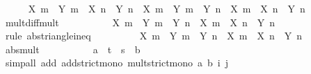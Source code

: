 \begin{isabellebody}
\ \ \ \ \isamarkupfalse%
\ {\isachardoublequoteopen}{\isasymbar}X\ m\ {\isacharasterisk}{\kern0pt}\ Y\ m\ {\isacharminus}{\kern0pt}\ X\ n\ {\isacharasterisk}{\kern0pt}\ Y\ n{\isasymbar}\ {\isacharequal}{\kern0pt}\ {\isasymbar}X\ m\ {\isacharasterisk}{\kern0pt}\ {\isacharparenleft}{\kern0pt}Y\ m\ {\isacharminus}{\kern0pt}\ Y\ n{\isacharparenright}{\kern0pt}\ {\isacharplus}{\kern0pt}\ {\isacharparenleft}{\kern0pt}X\ m\ {\isacharminus}{\kern0pt}\ X\ n{\isacharparenright}{\kern0pt}\ {\isacharasterisk}{\kern0pt}\ Y\ n{\isasymbar}{\isachardoublequoteclose}\isanewline
\ \ \ \ \ \ \isamarkupfalse%
\ mult{\isacharunderscore}{\kern0pt}diff{\isacharunderscore}{\kern0pt}mult\ \isacommand{{\isachardot}{\kern0pt}{\isachardot}{\kern0pt}}\isamarkupfalse%
\isanewline
\ \ \ \ \isamarkupfalse%
\ \isamarkupfalse%
\ {\isachardoublequoteopen}{\isasymdots}\ {\isasymle}\ {\isasymbar}X\ m\ {\isacharasterisk}{\kern0pt}\ {\isacharparenleft}{\kern0pt}Y\ m\ {\isacharminus}{\kern0pt}\ Y\ n{\isacharparenright}{\kern0pt}{\isasymbar}\ {\isacharplus}{\kern0pt}\ {\isasymbar}{\isacharparenleft}{\kern0pt}X\ m\ {\isacharminus}{\kern0pt}\ X\ n{\isacharparenright}{\kern0pt}\ {\isacharasterisk}{\kern0pt}\ Y\ n{\isasymbar}{\isachardoublequoteclose}\isanewline
\ \ \ \ \ \ \isamarkupfalse%
\ {\isacharparenleft}{\kern0pt}rule\ abs{\isacharunderscore}{\kern0pt}triangle{\isacharunderscore}{\kern0pt}ineq{\isacharparenright}{\kern0pt}\isanewline
\ \ \ \ \isamarkupfalse%
\ \isamarkupfalse%
\ {\isachardoublequoteopen}{\isasymdots}\ {\isacharequal}{\kern0pt}\ {\isasymbar}X\ m{\isasymbar}\ {\isacharasterisk}{\kern0pt}\ {\isasymbar}Y\ m\ {\isacharminus}{\kern0pt}\ Y\ n{\isasymbar}\ {\isacharplus}{\kern0pt}\ {\isasymbar}X\ m\ {\isacharminus}{\kern0pt}\ X\ n{\isasymbar}\ {\isacharasterisk}{\kern0pt}\ {\isasymbar}Y\ n{\isasymbar}{\isachardoublequoteclose}\isanewline
\ \ \ \ \ \ \isamarkupfalse%
\ abs{\isacharunderscore}{\kern0pt}mult\ \isacommand{{\isachardot}{\kern0pt}{\isachardot}{\kern0pt}}\isamarkupfalse%
\isanewline
\ \ \ \ \isamarkupfalse%
\ \isamarkupfalse%
\ {\isachardoublequoteopen}{\isasymdots}\ {\isacharless}{\kern0pt}\ a\ {\isacharasterisk}{\kern0pt}\ t\ {\isacharplus}{\kern0pt}\ s\ {\isacharasterisk}{\kern0pt}\ b{\isachardoublequoteclose}\isanewline
\ \ \ \ \ \ \isamarkupfalse%
\ {\isacharparenleft}{\kern0pt}simp{\isacharunderscore}{\kern0pt}all\ add{\isacharcolon}{\kern0pt}\ add{\isacharunderscore}{\kern0pt}strict{\isacharunderscore}{\kern0pt}mono\ mult{\isacharunderscore}{\kern0pt}strict{\isacharunderscore}{\kern0pt}mono{\isacharprime}{\kern0pt}\ a\ b\ i\ j\ {\isacharasterisk}{\kern0pt}{\isacharparenright}{\kern0pt}\isanewline

\end{isabellebody}

